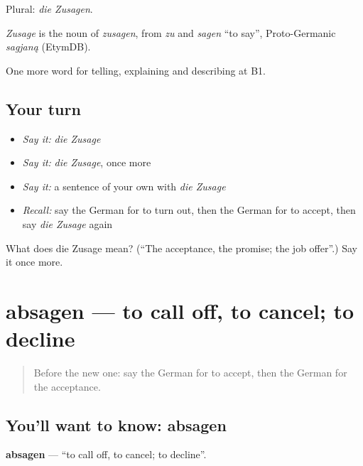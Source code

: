 Plural: \emph{die Zusagen}.

\begin{cousinweb}
\emph{Zusage} is the noun of \emph{zusagen}, from \emph{zu} and \emph{sagen} \textquotedblleft{}to say\textquotedblright{}, Proto-Germanic \emph{sagjaną} (EtymDB).
\end{cousinweb}

\begin{grammarlens}[title={What you've built}]
One more word for telling, explaining and describing at B1.
\end{grammarlens}

\subsection*{Your turn}
\begin{itemize}
\raggedright
  \item \emph{Say it:} \emph{die Zusage}
  \item \emph{Say it:} \emph{die Zusage}, once more
  \item \emph{Say it:} a sentence of your own with \emph{die Zusage}
  \item \emph{Recall:} say the German for to turn out, then the German for to accept, then say \emph{die Zusage} again
\end{itemize}

\begin{tcolorbox}[breakable,colback=teal!4,colframe=teal!35!black,title={Before you move on}]
What does die Zusage mean? (\textquotedblleft{}The acceptance, the promise; the job offer\textquotedblright{}.) Say it once more.
\end{tcolorbox}
\section[absagen]{absagen — to call off, to cancel; to decline}

\label{lesson:GE-C371-absagen}



\begin{quote}
Before the new one: say the German for to accept, then the German for the acceptance.
\end{quote}

\subsection*{You'll want to know: absagen}
\textbf{absagen} — \textquotedblleft{}to call off, to cancel; to decline\textquotedblright{}.

